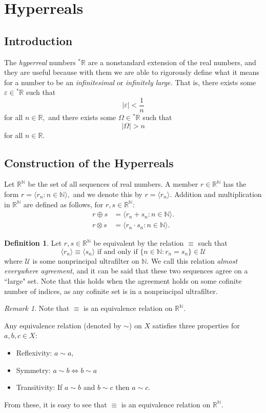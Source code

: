 \documentclass[12pt]{amsart}
\newcommand{\eps}{\varepsilon}
\newcommand{\stt}{{}^*}
\newcommand{\NN}{\mathbb{N}}
\newcommand{\RR}{\mathbb{R}}
\newcommand{\mcU}{\mathcal{U}}
\theoremstyle{plain}
\theoremstyle{definition}
\newtheorem{defn}[thm]{Definition}
\theoremstyle{remark}
\newtheorem{rem}[thm]{Remark}
\theoremstyle{theorem}
\numberwithin{equation}{section}
\numberwithin{thm}{section}
\begin{document}
\section{Hyperreals}
\subsection{Introduction} The \textit{hyperreal} numbers $\stt \RR$ are a nonstandard extension of the real numbers, and they are useful because with them we are able to rigorously define what it means for a number to be an \textit{infinitesimal} or \textit{infinitely large.} That is, there exists some $\eps \in \stt \RR$ such that \[|\eps| < \frac{1}{n}\] for all $n \in \RR,$ and there exists some $\Omega \in \stt \RR$ such that \[| \Omega | > n\] for all $n \in \RR.$
\subsection{Construction of the Hyperreals}
Let $\RR^\NN$ be the set of all sequences of real numbers. A member $r \in \RR^\NN$ has the form $r = \langle r_n : n\in \NN \rangle,$ and we denote this by $r = \langle r_n \rangle.$ Addition and multiplication in $\RR^\NN$ are defined as follows, for $r,s \in \RR^\NN$: 
\begin{align*}
    r \oplus s &= \langle r_n + s_n : n\in \NN \rangle. \\
    r \otimes s &= \langle r_n \cdot s_n : n\in \NN \rangle.
\end{align*}
\begin{defn}
Let $r,s \in \RR^\NN$ be equivalent by the relation $\equiv$ such that
\[\langle r_n \rangle \equiv \langle s_n \rangle \text{ if and only if } \{n \in \NN : r_n = s_n \} \in \mcU\]
where $\mcU$ is some nonprincipal ultrafilter on $\NN.$ We call this relation \textit{almost everywhere agreement}, and it can be said that these two sequences agree on a ``large" set. Note that this holds when the agreement holds on some cofinite number of indices, as any cofinite set is in a nonprincipal ultrafilter.
\end{defn}
\begin{rem}
Note that $\equiv$ is an equivalence relation on $\RR^\NN.$
\end{rem}
Any equivalence relation (denoted by $\sim$) on $X$ satisfies three properties for $a,b,c \in X$:
\begin{itemize}
    \item Reflexivity: $a\sim a,$
    \item Symmetry: $a\sim b \iff b \sim a$
    \item Transitivity: If $a \sim b$ and $b \sim c $ then $a \sim c.$
\end{itemize}
From these, it is easy to see that $\equiv$ is an equivalence relation on $\RR^\NN.$
\end{document}
